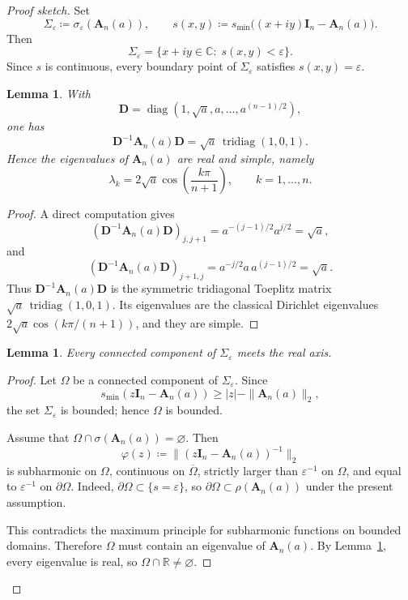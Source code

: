\documentclass[11pt]{article}
\newtheorem{lemma}[theorem]{Lemma}
\begin{document}
\begin{proof}[Proof sketch]
Set
\[
\Sigma_\varepsilon
\coloneqq
\sigma_\varepsilon(\mathbf A_n(a)),
\qquad
s(x,y)
\coloneqq
s_{\min}\!\bigl((x+iy)\mathbf I_n-\mathbf A_n(a)\bigr).
\]
Then
\[
\Sigma_\varepsilon
=
\{x+iy\in\mathbb C:\; s(x,y)<\varepsilon\}.
\]
Since \(s\) is continuous, every boundary point of \(\Sigma_\varepsilon\) satisfies
\(s(x,y)=\varepsilon\).

\begin{lemma}\label{lem:real-spectrum}
With
\[
\mathbf D=\operatorname{diag}(1,\sqrt a,a,\dots,a^{(n-1)/2}),
\]
one has
\[
\mathbf D^{-1}\mathbf A_n(a)\mathbf D
=
\sqrt a\,\operatorname{tridiag}(1,0,1).
\]
Hence the eigenvalues of \(\mathbf A_n(a)\) are real and simple, namely
\[
\lambda_k
=
2\sqrt a\cos\!\left(\frac{k\pi}{n+1}\right),
\qquad
k=1,\dots,n.
\]
\end{lemma}

\begin{proof}
A direct computation gives
\[
(\mathbf D^{-1}\mathbf A_n(a)\mathbf D)_{j,j+1}
=
a^{-(j-1)/2}a^{j/2}
=
\sqrt a,
\]
and
\[
(\mathbf D^{-1}\mathbf A_n(a)\mathbf D)_{j+1,j}
=
a^{-j/2}a\,a^{(j-1)/2}
=
\sqrt a.
\]
Thus \(\mathbf D^{-1}\mathbf A_n(a)\mathbf D\) is the symmetric tridiagonal Toeplitz
matrix \(\sqrt a\,\operatorname{tridiag}(1,0,1)\). Its eigenvalues are the classical Dirichlet
eigenvalues \(2\sqrt a\cos(k\pi/(n+1))\), and they are simple.
\end{proof}

\begin{lemma}\label{lem:real-axis}
Every connected component of \(\Sigma_\varepsilon\) meets the real axis.
\end{lemma}

\begin{proof}
Let \(\Omega\) be a connected component of \(\Sigma_\varepsilon\).
Since
\[
s_{\min}(z\mathbf I_n-\mathbf A_n(a))\ge |z|-\|\mathbf A_n(a)\|_2,
\]
the set \(\Sigma_\varepsilon\) is bounded; hence \(\Omega\) is bounded.

Assume that \(\Omega\cap\sigma(\mathbf A_n(a))=\varnothing\).
Then
\[
\varphi(z)\coloneqq \|(z\mathbf I_n-\mathbf A_n(a))^{-1}\|_2
\]
is subharmonic on \(\Omega\), continuous on \(\overline{\Omega}\), strictly larger than
\(\varepsilon^{-1}\) on \(\Omega\), and equal to \(\varepsilon^{-1}\) on \(\partial\Omega\).
Indeed, \(\partial\Omega\subset\{s=\varepsilon\}\), so \(\partial\Omega\subset\rho(\mathbf A_n(a))\)
under the present assumption.

This contradicts the maximum principle for subharmonic functions on bounded domains.
Therefore \(\Omega\) must contain an eigenvalue of \(\mathbf A_n(a)\). By
Lemma~\ref{lem:real-spectrum}, every eigenvalue is real, so
\(\Omega\cap\mathbb R\neq\varnothing\).
\end{proof}


\end{proof}
\end{document}
